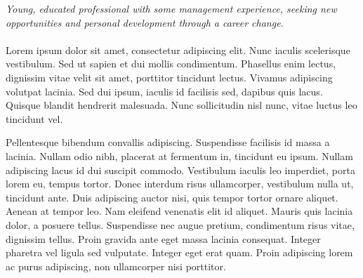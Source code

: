 \documentclass[10pt,letterpaper]{article} %
\begin{document}
\begin{multicols}{2}  %
\noindent \textit{Young, educated professional with some management experience, seeking new opportunities and personal development through a career change.}\\\\

Lorem ipsum dolor sit amet, consectetur adipiscing elit. Nunc iaculis scelerisque vestibulum. Sed ut sapien et dui mollis condimentum. Phasellus enim lectus, dignissim vitae velit sit amet, porttitor tincidunt lectus. Vivamus adipiscing volutpat lacinia. Sed dui ipsum, iaculis id facilisis sed, dapibus quis lacus. Quisque blandit hendrerit malesuada. Nunc sollicitudin nisl nunc, vitae luctus leo tincidunt vel.

Pellentesque bibendum convallis adipiscing. Suspendisse facilisis id massa a lacinia. Nullam odio nibh, placerat at fermentum in, tincidunt eu ipsum. Nullam adipiscing lacus id dui suscipit commodo. Vestibulum iaculis leo imperdiet, porta lorem eu, tempus tortor. Donec interdum risus ullamcorper, vestibulum nulla ut, tincidunt ante. Duis adipiscing auctor nisi, quis tempor tortor ornare aliquet. Aenean at tempor leo. Nam eleifend venenatis elit id aliquet. Mauris quis lacinia dolor, a posuere tellus. Suspendisse nec augue pretium, condimentum risus vitae, dignissim tellus. Proin gravida ante eget massa lacinia consequat. Integer pharetra vel ligula sed vulputate. Integer eget erat quam. Proin adipiscing lorem ac purus adipiscing, non ullamcorper nisi porttitor. 



\end{multicols}

\spacedhrule{0.5em}{-0.4em} %

\end{document}
